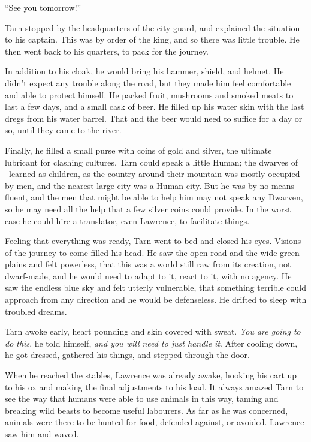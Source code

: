 ``See you tomorrow!''

Tarn stopped by the headquarters of the city guard, and explained the situation to his captain.  This was by order of the king, and so there was little trouble.  He then went back to his quarters, to pack for the journey.

In addition to his cloak, he would bring his hammer, shield, and helmet.  He didn't expect any trouble along the road, but they made him feel comfortable and able to protect himself.  He packed fruit, mushrooms and smoked meats to last a few days, and a small cask of beer.  He filled up his water skin with the last dregs from his water barrel.  That and the beer would need to suffice for a day or so, until they came to the river.

Finally, he filled a small purse with coins of gold and silver, the ultimate lubricant for clashing cultures.  Tarn could speak a little Human; the dwarves of \korbarthrond\ learned as children, as the country around their mountain was mostly occupied by men, and the nearest large city was a Human city.  But he was by no means fluent, and the men that might be able to help him may not speak any Dwarven, so he may need all the help that a few silver coins could provide.  In the worst case he could hire a translator, even Lawrence, to facilitate things.

Feeling that everything was ready, Tarn went to bed and closed his eyes.  Visions of the journey to come filled his head.  He saw the open road and the wide green plains and felt powerless, that this was a world still raw from its creation, not dwarf-made, and he would need to adapt to it, react to it, with no agency.  He saw the endless blue sky and felt utterly vulnerable, that something terrible could approach from any direction and he would be defenseless.  He drifted to sleep with troubled dreams.

Tarn awoke early, heart pounding and skin covered with sweat.  \emph{You are going to do this}, he told himself, \emph{and you will need to just handle it}.  After cooling down, he got dressed, gathered his things, and stepped through the door.

When he reached the stables, Lawrence was already awake, hooking his cart up to his ox and making the final adjustments to his load.  It always amazed Tarn to see the way that humans were able to use animals in this way, taming and breaking wild beasts to become useful labourers.  As far as he was concerned, animals were there to be hunted for food, defended against, or avoided.  Lawrence saw him and waved.

